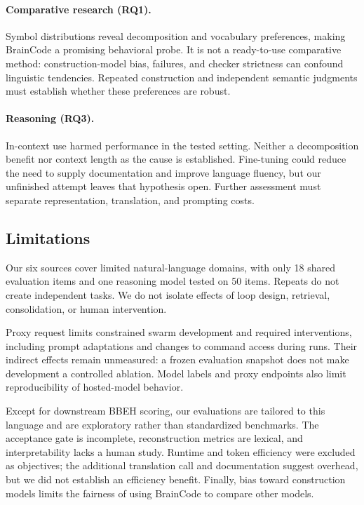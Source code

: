 \documentclass[11pt]{article}
\newcommand{\bc}{BrainCode}
\begin{document}
\paragraph{Comparative research (RQ1).}
Symbol distributions reveal decomposition and vocabulary preferences, making \bc{} a promising behavioral probe. It is not a ready-to-use comparative method: construction-model bias, failures, and checker strictness can confound linguistic tendencies. Repeated construction and independent semantic judgments must establish whether these preferences are robust.

\paragraph{Reasoning (RQ3).}
In-context use harmed performance in the tested setting. Neither a decomposition benefit nor context length as the cause is established. Fine-tuning could reduce the need to supply documentation and improve language fluency, but our unfinished attempt leaves that hypothesis open. Further assessment must separate representation, translation, and prompting costs.

\subsection{Limitations}
Our six sources cover limited natural-language domains, with only 18 shared evaluation items and one reasoning model tested on 50 items. Repeats do not create independent tasks. We do not isolate effects of loop design, retrieval, consolidation, or human intervention.

Proxy request limits constrained swarm development and required interventions, including prompt adaptations and changes to command access during runs. Their indirect effects remain unmeasured: a frozen evaluation snapshot does not make development a controlled ablation. Model labels and proxy endpoints also limit reproducibility of hosted-model behavior.

Except for downstream BBEH scoring, our evaluations are tailored to this language and are exploratory rather than standardized benchmarks. The acceptance gate is incomplete, reconstruction metrics are lexical, and interpretability lacks a human study. Runtime and token efficiency were excluded as objectives; the additional translation call and documentation suggest overhead, but we did not establish an efficiency benefit. Finally, bias toward construction models limits the fairness of using \bc{} to compare other models.
\end{document}
